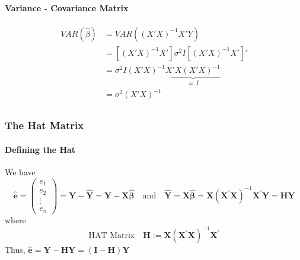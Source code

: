 \documentclass[11pt]{article}
\begin{document}
\paragraph{Variance - Covariance Matrix}
\begin{align*}
    VAR(\hat{\beta}) &= VAR( (X'X)^{-1}X'Y ) \\
    &= [(X'X)^{-1}X'] \sigma^2 I [(X'X)^{-1}X']' \\
    &= \sigma^2 I (X'X)^{-1}  \underbrace{X'X (X'X)^{-1}}_{\equiv~I} \\
    &= \sigma^2 (X'X)^{-1} \\
\end{align*}

\subsubsection{The Hat Matrix}
\paragraph{Defining the Hat}
We have
\begin{equation*}
    \widehat{\mathbf{e}}=\left(\begin{array}{c}{e_{1}} \\ {e_{2}} \\ {\vdots} \\ {e_{n}}\end{array}\right)=\mathbf{Y}-\widehat{\mathbf{Y}}=\mathbf{Y}-\mathbf{X} \widehat{\boldsymbol{\beta}} \quad \text{and} \quad  \widehat{\mathbf{Y}}=\mathbf{X} \widehat{\boldsymbol{\beta}}=\mathbf{X}\left(\mathbf{X}^{\prime} \mathbf{X}\right)^{-1} \mathbf{X}^{\prime} \mathbf{Y}=\mathbf{H} \mathbf{Y}
\end{equation*}
where
\begin{equation*}
    \text{HAT Matrix} \quad \mathbf{H} := \mathbf{X}\left(\mathbf{X}^{\prime} \mathbf{X}\right)^{-1} \mathbf{X}^{\prime}
\end{equation*}
Thus, $\widehat{\mathbf{e}}=\mathbf{Y}-\mathbf{H Y}=(\mathbf{I}-\mathbf{H}) \mathbf{Y}$
\end{document}
